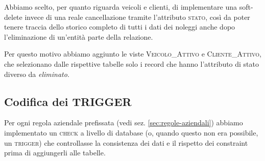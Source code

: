 \documentclass{article}
\begin{document}
Abbiamo scelto, per quanto riguarda veicoli e clienti, di implementare una soft-delete invece di una reale cancellazione tramite l'attributo \textsc{stato}, così da poter tenere traccia dello storico completo di tutti i dati dei noleggi anche dopo l'eliminazione di un'entità parte della relazione.

Per questo motivo abbiamo aggiunto le viste \textsc{Veicolo\_Attivo} e \textsc{Cliente\_Attivo}, che selezionano dalle rispettive tabelle solo i record che hanno l'attributo di stato diverso da \textit{eliminato}.



\subsection{Codifica dei TRIGGER}

Per ogni regola aziendale prefissata (vedi sez. \ref{sec:regole-aziendali}) abbiamo implementato un \textsc{check} a livello di database (o, quando questo non era possibile, un \textsc{trigger}) che controllasse la consistenza dei dati e il rispetto dei constraint prima di aggiungerli alle tabelle.

\end{document}
